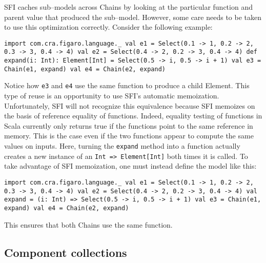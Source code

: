 SFI caches sub--models across Chains by looking at the particular function and parent value that produced the sub--model. However, some care needs to be taken to use this optimization correctly. Consider the following example:

\begin{flushleft}
\texttt{import com.cra.figaro.language.\_
\newline 
\newline val e1 = Select(0.1 -> 1, 0.2 -> 2, 0.3 -> 3, 0.4 -> 4)
\newline val e2 = Select(0.4 -> 2, 0.2 -> 3, 0.4 -> 4)
\newline def expand(i: Int): Element[Int] = Select(0.5 -> i, 0.5 -> i + 1)
\newline val e3 = Chain(e1, expand)
\newline val e4 = Chain(e2, expand)
}
\end{flushleft}

Notice how \texttt{e3} and \texttt{e4} use the same function to produce a child Element. This type of reuse is an opportunity to use SFI's automatic memoization. Unfortunately, SFI will not recognize this equivalence because SFI memoizes on the basis of reference equality of functions. Indeed, equality testing of functions in Scala currently only returns true if the functions point to the same reference in memory. This is the case even if the two functions appear to compute the same values on inputs. Here, turning the \texttt{expand} method into a function actually creates a new instance of an \texttt{Int => Element[Int]} both times it is called. To take advantage of SFI memoization, one must instead define the model like this:

\begin{flushleft}
\texttt{import com.cra.figaro.language.\_
\newline 
\newline val e1 = Select(0.1 -> 1, 0.2 -> 2, 0.3 -> 3, 0.4 -> 4)
\newline val e2 = Select(0.4 -> 2, 0.2 -> 3, 0.4 -> 4)
\newline val expand = (i: Int) => Select(0.5 -> i, 0.5 -> i + 1)
\newline val e3 = Chain(e1, expand)
\newline val e4 = Chain(e2, expand)
}
\end{flushleft}

This ensures that both Chains use the same function.

\subsection{Component collections}
\label{ComponentCollections}

